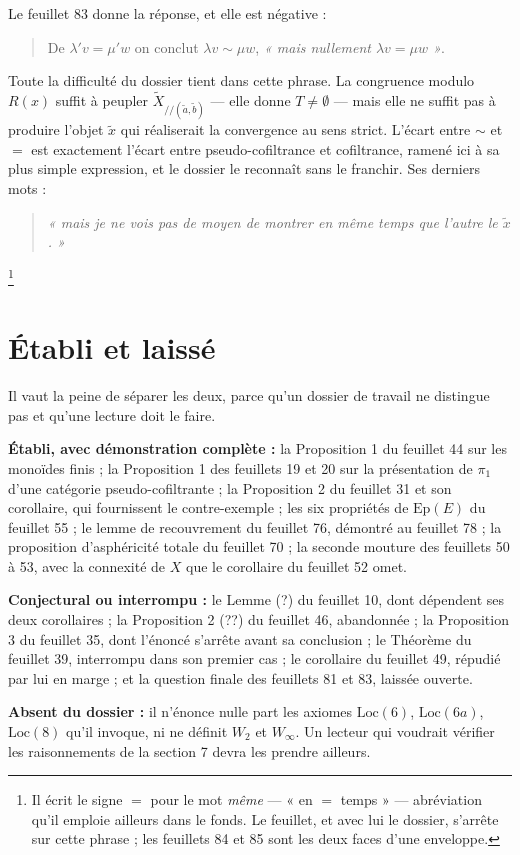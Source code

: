 \documentclass[11pt,a4paper]{article}
\begin{document}
Le feuillet 83 donne la réponse, et elle est négative :

\begin{quote}
De $\lambda' v = \mu' w$ on conclut $\lambda v \sim \mu w$,
\emph{« mais nullement $\lambda v = \mu w$ »}.
\end{quote}

Toute la difficulté du dossier tient dans cette phrase. La congruence modulo
$R(x)$ suffit à peupler $\tilde X_{/\!/(\tilde a,\tilde b)}$ — elle donne
$T \neq \emptyset$ — mais elle ne suffit pas à produire l'objet $\tilde x$ qui
réaliserait la convergence au sens strict. L'écart entre $\sim$ et $=$ est
exactement l'écart entre pseudo-cofiltrance et cofiltrance, ramené ici à sa
plus simple expression, et le dossier le reconnaît sans le franchir. Ses
derniers mots :

\begin{quote}
\emph{« mais je ne vois pas de moyen de montrer en même temps que l'autre le
$\tilde x$. »}
\end{quote}

\footnote{Il écrit le signe $=$ pour le mot \emph{même} — « en $=$ temps » —
abréviation qu'il emploie ailleurs dans le fonds. Le feuillet, et avec lui le
dossier, s'arrête sur cette phrase ; les feuillets 84 et 85 sont les deux
faces d'une enveloppe.}

\section*{Établi et laissé}

Il vaut la peine de séparer les deux, parce qu'un dossier de travail ne
distingue pas et qu'une lecture doit le faire.

\textbf{Établi, avec démonstration complète :} la Proposition 1 du feuillet 44
sur les monoïdes finis ; la Proposition 1 des feuillets 19 et 20 sur la
présentation de $\pi_{1}$ d'une catégorie pseudo-cofiltrante ; la
Proposition 2 du feuillet 31 et son corollaire, qui fournissent le
contre-exemple ; les six propriétés de $\mathrm{Ep}(E)$ du feuillet 55 ; le
lemme de recouvrement du feuillet 76, démontré au feuillet 78 ; la proposition
d'asphéricité totale du feuillet 70 ; la seconde mouture des feuillets 50
à 53, avec la connexité de $X$ que le corollaire du feuillet 52 omet.

\textbf{Conjectural ou interrompu :} le Lemme (?) du feuillet 10, dont
dépendent ses deux corollaires ; la Proposition 2 (??) du feuillet 46,
abandonnée ; la Proposition 3 du feuillet 35, dont l'énoncé s'arrête avant sa
conclusion ; le Théorème du feuillet 39, interrompu dans son premier cas ; le
corollaire du feuillet 49, répudié par lui en marge ; et la question finale
des feuillets 81 et 83, laissée ouverte.

\textbf{Absent du dossier :} il n'énonce nulle part les axiomes
$\mathrm{Loc}(6)$, $\mathrm{Loc}(6a)$, $\mathrm{Loc}(8)$ qu'il invoque, ni ne
définit $W_{2}$ et $W_{\infty}$. Un lecteur qui voudrait vérifier les
raisonnements de la section 7 devra les prendre ailleurs.
\end{document}

